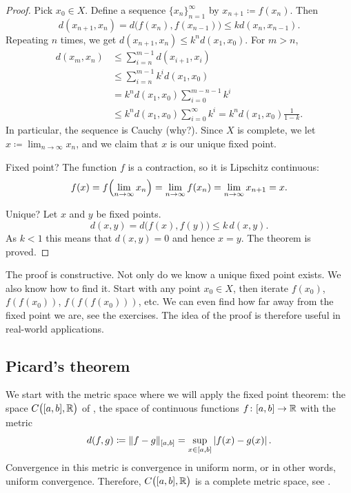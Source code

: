 \begin{proof}
Pick $x_0 \in X$.
Define a sequence $\{ x_n \}_{n=1}^\infty$ by $x_{n+1} \coloneqq f(x_n)$.  Then
\begin{equation*}
d(x_{n+1},x_n) = d\bigl(f(x_n),f(x_{n-1})\bigr)
\leq k d(x_n,x_{n-1}) .
\end{equation*}
Repeating $n$ times, we get $d(x_{n+1},x_n) \leq k^n d(x_1,x_0)$.
For $m > n$,
\begin{equation*}
\begin{split}
d(x_m,x_n)
& \leq \sum_{i=n}^{m-1} d(x_{i+1},x_i) \\
& \leq \sum_{i=n}^{m-1} k^i d(x_1,x_0) \\
& = k^n d(x_1,x_0) \sum_{i=0}^{m-n-1} k^i \\
& \leq k^n d(x_1,x_0) \sum_{i=0}^{\infty} k^i
= k^n d(x_1,x_0) \frac{1}{1-k} .
\end{split}
\end{equation*}
In particular, the sequence is Cauchy (why?).  Since $X$ is complete,
we let $x \coloneqq \lim_{n\to\infty} x_n$, and we claim that $x$
is our unique fixed point.

Fixed point?  The function $f$ is a contraction,
so it is Lipschitz continuous:
\begin{equation*}
f(x) = f\Bigl( \lim_{n\to\infty} x_n\Bigr) = \lim_{n\to\infty} f(x_n) =
\lim_{n\to\infty} x_{n+1} = x .
\end{equation*}

Unique?  Let $x$ and $y$ be fixed points.
\begin{equation*}
d(x,y) = d\bigl(f(x),f(y)\bigr) \leq k\, d(x,y) .
\end{equation*}
As $k < 1$ this means that $d(x,y) = 0$ and hence $x=y$.  The theorem is
proved.
\end{proof}

The proof is constructive.  Not only do we know 
a unique fixed point exists.  We also know how to find it.  Start with
any point $x_0 \in X$, then iterate $f(x_0)$,
$f(f(x_0))$,
$f(f(f(x_0)))$, etc.  We can even find how far away
from the fixed point we are, see the exercises.  The idea of the proof is
therefore useful in real-world applications.

\subsection{Picard's theorem}

We start with the metric space where we will apply the
fixed point theorem:
the space $C\bigl([a,b],{\mathbb{R}}\bigr)$ of ,
the space of continuous functions $f \colon [a,b] \to {\mathbb{R}}$ with the metric
\begin{equation*}
d(f,g) \coloneqq \lVert {f-g} \rVert_{[a,b]} = \sup_{x \in [a,b]} \left\lvert {f(x)-g(x)} \right\rvert .
\end{equation*}
Convergence in this metric is convergence in uniform norm, or in other
words, uniform convergence.  Therefore,
$C\bigl([a,b],{\mathbb{R}}\bigr)$ is a complete metric space,
see .

